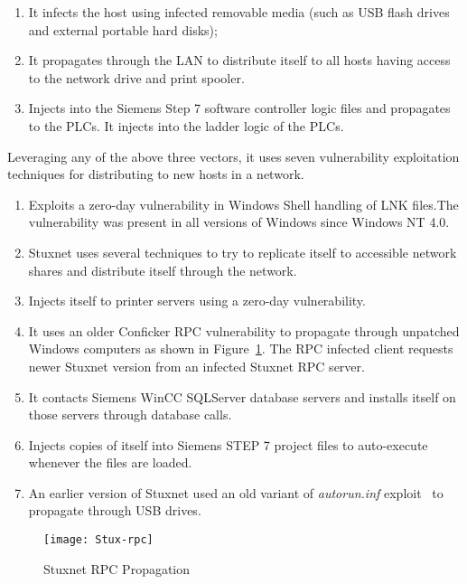 \documentclass[article,msc=informatik,type=msc,colorback,accentcolor=tud9c]{tudthesis}
\begin{document}
	\begin{enumerate}
	\item It infects the host using infected removable media (such as USB flash drives and external portable hard disks);
	\item It propagates through the \ac{LAN} to distribute itself to all hosts having access to the network drive and print spooler. 
	\item Injects into the Siemens Step 7 software controller logic files and propagates to the \ac{PLC}s. It injects into the ladder logic of the \ac{PLC}s.
	
	\end{enumerate}
	
	Leveraging any of the above three vectors, it uses seven vulnerability exploitation techniques for distributing to new hosts in a network.
	
	
	\begin{enumerate}
	
	\item Exploits a zero-day vulnerability in Windows Shell handling of LNK files.The vulnerability was present in all versions of Windows since Windows NT 4.0. 
	\item Stuxnet uses several techniques to try to replicate itself to accessible network shares and distribute itself through the network.
	\item Injects itself to printer servers using a zero-day vulnerability.
	\item It uses an older Conficker \ac{RPC} vulnerability to propagate through unpatched Windows computers as shown in Figure~\ref{f:Stuxnet RPC Propagation}. The \ac{RPC} infected client requests newer Stuxnet version from an infected Stuxnet RPC server. 
	\item It contacts Siemens \ac{WinCC} SQLServer database servers and installs itself on those servers through database calls. 
	\item Injects copies of itself into Siemens STEP 7 project files to auto-execute whenever the files are loaded.
	\item An earlier version of Stuxnet used an old variant of \textit{autorun.inf} exploit~\cite{larimer2011beyond} to propagate through USB drives. 
	
	\end{enumerate}
	
	
	\begin{figure}[H]
		\centering
		        \texttt{[image: Stux-rpc]}
		        \caption[Stuxnet RPC Propagation]{\label{f:Stuxnet RPC Propagation}Stuxnet RPC Propagation}
	\end{figure}
	
\end{document}
